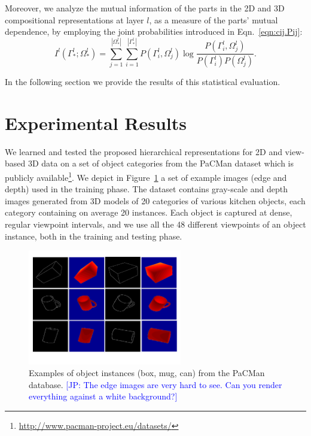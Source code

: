 \documentclass[runningheads]{llncs}
\newcommand{\commentJP}[1]{\textcolor{blue}{[JP: #1]}}
\begin{document}
Moreover, we analyze the mutual information of the parts in the 2D and 3D compositional representations at layer $l$, as a measure of the parts' mutual dependence, by employing the joint probabilities introduced in Eqn.~\ref{eqn:cij.Pij}:
\begin{equation}
 I^l(\Gamma_*^l;\Omega_*^l) = \sum\limits_{j=1}^{|\Omega_*^l|}\sum\limits_{i=1}^{|\Gamma_*^l|}P({\Gamma_i^l},\Omega_j^l)\log \frac{P({\Gamma_i^l},\Omega_j^l)}{P({\Gamma_i^l})P(\Omega_j^l)}.
\end{equation}

In the following section we provide the results of this statistical evaluation.

\section{Experimental Results}
\label{sec:results}

We learned and tested the proposed hierarchical representations for 2D and view-based 3D data on a set of object categories from the PaCMan dataset which is publicly available\footnote{\url{http://www.pacman-project.eu/datasets/}}. We depict in Figure~\ref{database} a set of example images (edge and depth) used in the training phase. The dataset contains gray-scale and depth images generated from 3D models of 20 categories of various kitchen objects, each category containing on average 20 instances. Each object is captured at dense, regular viewpoint intervals, and we use all the 48 different viewpoints of an object instance, both in the training and testing phase.

\begin{figure}
\begin{center}
\includegraphics[width=0.6\textwidth]{database}
\end{center}
\caption{Examples of object instances (box, mug, can) from the PaCMan database. \commentJP{The edge images are very hard to see.  Can you render everything against a white background?}}
\label{database}
\end{figure}
\end{document}
